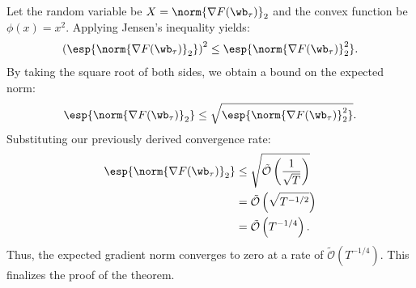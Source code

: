 \documentclass[11pt, letterpaper]{article}
\begin{document}
Let the random variable be $X = \norm{\nabla F(\wb_{\tau})}_2$ and the convex function be $\phi(x) = x^2$. Applying Jensen's inequality yields:
\begin{align*}
    \left(\esp{\norm{\nabla F(\wb_{\tau})}_2}\right)^2 \le \esp{\norm{\nabla F(\wb_{\tau})}_2^2}.
\end{align*}
By taking the square root of both sides, we obtain a bound on the expected norm:
\begin{align*}
    \esp{\norm{\nabla F(\wb_{\tau})}_2} \le \sqrt{\esp{\norm{\nabla F(\wb_{\tau})}_2^2}}.
\end{align*}
Substituting our previously derived convergence rate:
\begin{align*}
    \esp{\norm{\nabla F(\wb_{\tau})}_2} &\le \sqrt{\tilde{\mathcal{O}}\left(\frac{1}{\sqrt{T}}\right)} \\
    &= \tilde{\mathcal{O}}\left(\sqrt{T^{-1/2}}\right) \\
    &= \tilde{\mathcal{O}}\left(T^{-1/4}\right).
\end{align*}
Thus, the expected gradient norm converges to zero at a rate of $\tilde{\mathcal{O}}(T^{-1/4})$. This finalizes the proof of the theorem.
\end{document}
